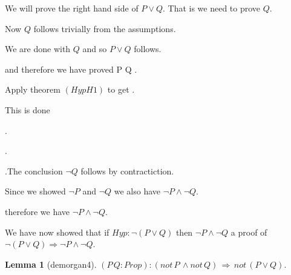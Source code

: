 \documentclass[11pt, oneside]{article}
\newtheorem{Lemma}{Lemma}
\begin{document}
\begin{subproof}
\begin{subproof}
\begin{subproof}
\begin{subproof}
\begin{subproof}
\begin{subproof}
 \begin{subproof}We will prove the right hand side of $P \lor Q $. That is we need to prove $Q $.\begin{subproof}Now $Q $ follows trivially from the assumptions.\end{subproof} We are done with $Q $ and so $P \lor Q $ follows.\end{subproof} and therefore we have proved P \lor Q .\begin{subproof}Apply theorem $(Hyp H1)$ to get $ $.\begin{subproof}This is done\end{subproof}\end{subproof}.\end{subproof}.\end{subproof}.The conclusion $¬ Q $ follows by contractiction.\end{subproof} Since we showed $¬ P $ and $¬ Q $ we also have $¬ P \land ¬ Q $.\end{subproof} therefore we have $¬ P \land ¬ Q $.\end{subproof} We have now showed that if $Hyp : ¬ (P \lor Q) $ then $¬ P \land ¬ Q $ a proof of $¬ (P \lor Q) \Rightarrow ¬ P \land ¬ Q $.\end{subproof}\begin{Lemma}[demorgan4] 
$(P\,Q:Prop):(not\,P\,\land not\,Q)\,\Rightarrow \,not\,(P\lor Q).$
 \end{Lemma}
\end{document}
